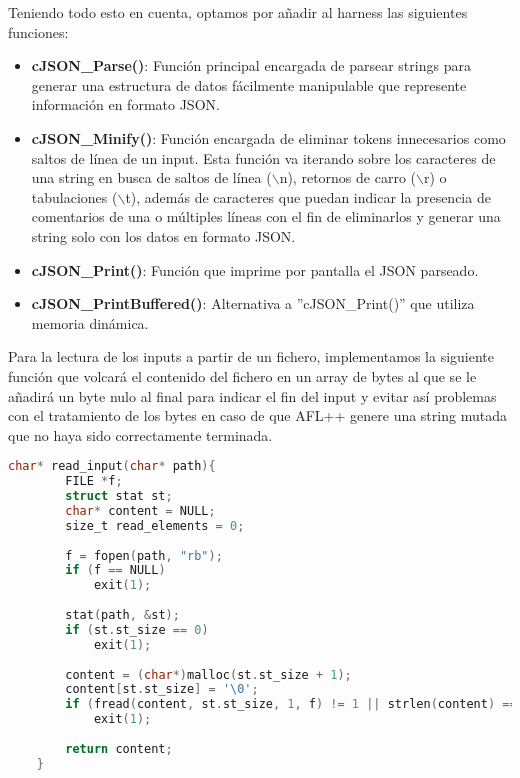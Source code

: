 Teniendo todo esto en cuenta, optamos por añadir al harness las siguientes funciones:
\begin{itemize}
    \item \textbf{cJSON\_Parse()}: Función principal encargada de parsear strings para generar una estructura de datos fácilmente manipulable que represente
    información en formato JSON. 
    \item \textbf{cJSON\_Minify()}: Función encargada de eliminar tokens innecesarios como saltos de línea de un input. Esta función va iterando sobre los
    caracteres de una string en busca de saltos de línea ($\backslash$n), retornos de carro ($\backslash$r) o tabulaciones ($\backslash$t), además de caracteres que 
    puedan indicar la presencia de comentarios de una o múltiples líneas con el fin de eliminarlos y generar una string solo con los datos en formato JSON.
    \item \textbf{cJSON\_Print()}: Función que imprime por pantalla el JSON parseado.
    \item \textbf{cJSON\_PrintBuffered()}: Alternativa a ''cJSON\_Print()'' que utiliza memoria dinámica.
\end{itemize}

Para la lectura de los inputs a partir de un fichero, implementamos la siguiente función que volcará el contenido del fichero en un array de bytes al que se le 
añadirá un byte nulo al final para indicar el fin del input y evitar así problemas con el tratamiento de los bytes en caso de que AFL++ genere una string mutada 
que no haya sido correctamente terminada.

\begin{lstlisting}[language=C, caption=Lectura de inputs desde fichero en el harness., captionpos=b,
    frame=single, breaklines, showstringspaces=false]
    char* read_input(char* path){
        FILE *f;
        struct stat st;
        char* content = NULL;
        size_t read_elements = 0;
    
        f = fopen(path, "rb");
        if (f == NULL)
            exit(1);
    
        stat(path, &st);
        if (st.st_size == 0)
            exit(1);
    
        content = (char*)malloc(st.st_size + 1);
        content[st.st_size] = '\0';                                                 // Avoid heap-buffer-overflow in strlen with non null terminated strings
        if (fread(content, st.st_size, 1, f) != 1 || strlen(content) == 0)
            exit(1);
        
        return content;
    }
\end{lstlisting}

